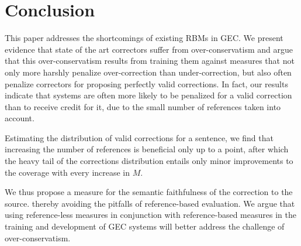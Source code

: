 \documentclass[letter,11pt]{article}
\begin{document}
%
%
%
\section{Conclusion}

This paper addresses the shortcomings of existing RBMs in GEC.
We present evidence that state of the art correctors suffer from over-conservatism and
argue that this over-conservatism results from training them against measures that
not only more harshly penalize over-correction than under-correction,
but also often penalize correctors for proposing perfectly valid corrections.
In fact, our results indicate that systems are often more likely to be penalized for a valid correction
than to receive credit for it, due to the small number of references taken into account.

Estimating the distribution of valid corrections for a sentence, we find
that increasing the number of references is beneficial only up to a point, after which
the heavy tail of the corrections distribution entails only minor improvements to the coverage
with every increase in $M$.

We thus propose a measure for the semantic faithfulness of the correction to the source.
thereby avoiding the pitfalls of reference-based evaluation. We argue that using reference-less
measures in conjunction with reference-based measures in the training and development of GEC
systems will better address the challenge of over-conservatism.
\end{document}
